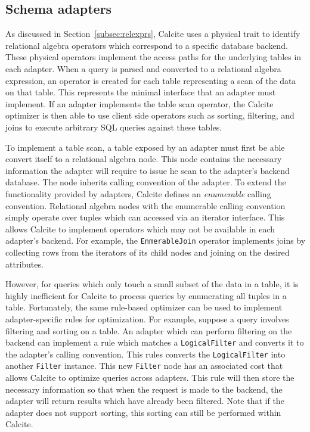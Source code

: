 \subsection{Schema adapters}
\label{subsec:adapters}


As discussed in Section~\ref{subsec:relexprs}, Calcite uses a physical trait to identify relational algebra operators which correspond to a specific database backend.
These physical operators implement the access paths for the underlying tables in each adapter.
When a query is parsed and converted to a relational algebra expression, an operator is created for each table representing a scan of the data on that table.
This represents the minimal interface that an adapter must implement.
If an adapter implements the table scan operator, the Calcite optimizer is then able to use client side operators such as sorting, filtering, and joins to execute arbitrary SQL queries against these tables.

To implement a table scan, a table exposed by an adapter must first be able convert itself to a relational algebra node.
This node contains the necessary information the adapter will require to issue he scan to the adapter's backend database.
The node inherits calling convention of the adapter.
To extend the functionality provided by adapters, Calcite defines an \emph{enumerable} calling convention.
Relational algebra nodes with the enumerable calling convention simply operate over tuples which can accessed via an iterator interface.
This allows Calcite to implement operators which may not be available in each adapter's backend.
For example, the \texttt{EnmerableJoin} operator implements joins by collecting rows from the iterators of its child nodes and joining on the desired attributes.

However, for queries which only touch a small subset of the data in a table, it is highly inefficient for Calcite to process queries by enumerating all tuples in a table.
Fortunately, the same rule-based optimizer can be used to implement adapter-specific rules for optimization.
For example, suppose a query involves filtering and sorting on a table.
An adapter which can perform filtering on the backend can implement a rule which matches a \texttt{LogicalFilter} and converts it to the adapter's calling convention.
This rules converts the \texttt{LogicalFilter} into another \texttt{Filter} instance.
This new \texttt{Filter} node has an associated cost that allows Calcite to optimize queries across adapters.
This rule will then store the necessary information so that when the request is made to the backend, the adapter will return results which have already been filtered.
Note that if the adapter does not support sorting, this sorting can still be performed within Calcite.

